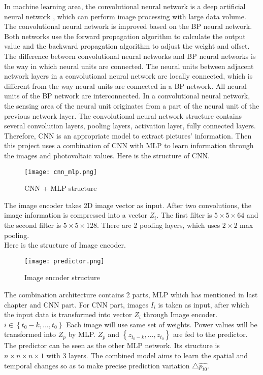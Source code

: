\documentclass{elegantpaper}
\begin{document}
In machine learning area, the convolutional neural network is a deep artificial neural network , which can perform image processing with large data volume.\cite{quan2016fusionnet} The convolutional neural network is improved based on the BP neural network.\cite{howard2013some} Both networks use the forward propagation algorithm to calculate the output value and the backward propagation algorithm to adjust the weight and offset. The difference between convolutional neural networks and BP neural networks is the way in which neural units are connected. \cite{Ketkar2017Convolutional} The neural units between adjacent network layers in a convolutional neural network are locally connected, which is different from the way neural units are connected in a BP network. All neural units of the BP network are interconnected. In a convolutional neural network, the sensing area of the neural unit originates from a part of the neural unit of the previous network layer. The convolutional neural network structure contains several convolution layers, pooling layers, activation layer, fully connected layers.\cite{lin2013network} \\[2ex]

Therefore, CNN is an appropriate model to extract pictures' information. Then this project uses a combination of CNN with MLP to learn information through the images and  photovoltaic values. Here is the structure of CNN.\\[2ex]


\begin{figure}[!ht]
	\centering
	\texttt{[image: cnn\_mlp.png]}
	\caption{CNN + MLP structure\label{fig:cnn_mlp}}
\end{figure}

The image encoder takes 2D image vector as input. After two convolutions, the image information is compressed into a vector $Z_{i}$. The first filter is $5\times5\times64$ and the second filter is $5\times5\times128$. There are 2 pooling layers, which uses $2\times2$ max pooling.\\
Here is the structure of Image encoder.

\begin{figure}[!ht]
	\centering
	\texttt{[image: predictor.png]}
	\caption{Image encoder structure\label{fig:Image encoder}}
\end{figure}



The combination architecture contains 2 parts, MLP which has mentioned in last chapter and CNN part. For CNN part, images $I_{i}$ is taken as input, after which the input data is transformed into vector $Z_{i}$ through Image encoder. $i\in \left \{ t_{0}-k, ... , t_{0} \right \}$ Each image will use same set of weights. Power values will be transformed into $Z_{p}$ by MLP. $Z_{p}$ and $\left \{ z_{t_{0}-k}, ... , z_{t_{0}} \right \}$ are fed to the predictor. The predictor can be seen as the other MLP network. Its structure is $n \times n \times n \times 1$ with 3 layers. The combined model aims to learn the spatial and temporal changes so as to make precise prediction variation $\bigtriangleup \hat{p_{t0}}$.\\[2ex]
\end{document}
